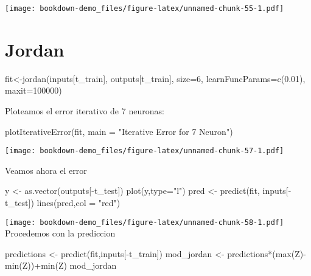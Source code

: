\documentclass[
]{book}
\newenvironment{Shaded}{\begin{snugshade}}{\end{snugshade}}
\newcommand{\AttributeTok}[1]{\textcolor[rgb]{0.77,0.63,0.00}{#1}}
\newcommand{\DecValTok}[1]{\textcolor[rgb]{0.00,0.00,0.81}{#1}}
\newcommand{\FloatTok}[1]{\textcolor[rgb]{0.00,0.00,0.81}{#1}}
\newcommand{\FunctionTok}[1]{\textcolor[rgb]{0.00,0.00,0.00}{#1}}
\newcommand{\NormalTok}[1]{#1}
\newcommand{\OtherTok}[1]{\textcolor[rgb]{0.56,0.35,0.01}{#1}}
\newcommand{\SpecialCharTok}[1]{\textcolor[rgb]{0.00,0.00,0.00}{#1}}
\newcommand{\StringTok}[1]{\textcolor[rgb]{0.31,0.60,0.02}{#1}}
\begin{document}
\texttt{[image: bookdown-demo\_files/figure-latex/unnamed-chunk-55-1.pdf]}

\hypertarget{jordan}{%
\chapter{Jordan}\label{jordan}}

\begin{Shaded}
\begin{Highlighting}[]
\NormalTok{fit}\OtherTok{\textless{}{-}}\FunctionTok{jordan}\NormalTok{(inputs[t\_train],}
\NormalTok{    outputs[t\_train],}
    \AttributeTok{size=}\DecValTok{6}\NormalTok{,}
    \AttributeTok{learnFuncParams=}\FunctionTok{c}\NormalTok{(}\FloatTok{0.01}\NormalTok{),}
    \AttributeTok{maxit=}\DecValTok{100000}\NormalTok{)}
\end{Highlighting}
\end{Shaded}

Ploteamos el error iterativo de 7 neuronas:

\begin{Shaded}
\begin{Highlighting}[]
\FunctionTok{plotIterativeError}\NormalTok{(fit, }\AttributeTok{main =} \StringTok{"Iterative Error for 7 Neuron"}\NormalTok{)}
\end{Highlighting}
\end{Shaded}

\texttt{[image: bookdown-demo\_files/figure-latex/unnamed-chunk-57-1.pdf]}

Veamos ahora el error

\begin{Shaded}
\begin{Highlighting}[]
\NormalTok{y }\OtherTok{\textless{}{-}} \FunctionTok{as.vector}\NormalTok{(outputs[}\SpecialCharTok{{-}}\NormalTok{t\_test])}
\FunctionTok{plot}\NormalTok{(y,}\AttributeTok{type=}\StringTok{"l"}\NormalTok{)}
\NormalTok{pred }\OtherTok{\textless{}{-}} \FunctionTok{predict}\NormalTok{(fit, inputs[}\SpecialCharTok{{-}}\NormalTok{t\_test])}
\FunctionTok{lines}\NormalTok{(pred,}\AttributeTok{col =} \StringTok{"red"}\NormalTok{)}
\end{Highlighting}
\end{Shaded}

\texttt{[image: bookdown-demo\_files/figure-latex/unnamed-chunk-58-1.pdf]}
Procedemos con la prediccion

\begin{Shaded}
\begin{Highlighting}[]
\NormalTok{predictions }\OtherTok{\textless{}{-}} \FunctionTok{predict}\NormalTok{(fit,inputs[}\SpecialCharTok{{-}}\NormalTok{t\_train])}
\NormalTok{mod\_jordan }\OtherTok{\textless{}{-}}\NormalTok{ predictions}\SpecialCharTok{*}\NormalTok{(}\FunctionTok{max}\NormalTok{(Z)}\SpecialCharTok{{-}}\FunctionTok{min}\NormalTok{(Z))}\SpecialCharTok{+}\FunctionTok{min}\NormalTok{(Z)}
\NormalTok{mod\_jordan}
\end{Highlighting}
\end{Shaded}
\end{document}
